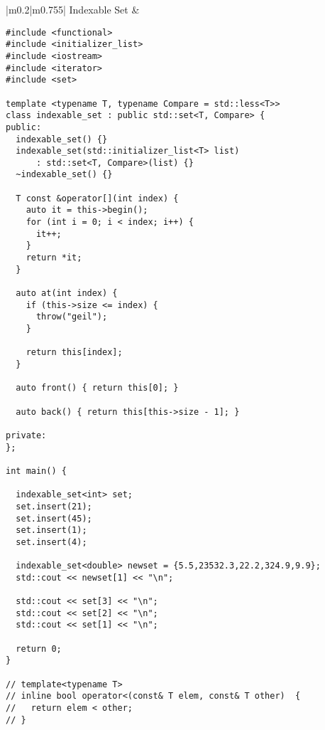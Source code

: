 \documentclass[main.tex,fontsize=8pt,paper=a4,paper=portrait,DIV=calc,]{scrartcl}
\begin{document}
\begin{table}[ht!]
\begin{tabular}{|m{0.2\linewidth}|m{0.755\linewidth}|}
\hline
Indexable Set & 
\vspace{2mm}
\begin{lstlisting}
#include <functional>
#include <initializer_list>
#include <iostream>
#include <iterator>
#include <set>

template <typename T, typename Compare = std::less<T>>
class indexable_set : public std::set<T, Compare> {
public:
  indexable_set() {}
  indexable_set(std::initializer_list<T> list)
      : std::set<T, Compare>(list) {}
  ~indexable_set() {}

  T const &operator[](int index) {
    auto it = this->begin();
    for (int i = 0; i < index; i++) {
      it++;
    }
    return *it;
  }

  auto at(int index) {
    if (this->size <= index) {
      throw("geil");
    }

    return this[index];
  }

  auto front() { return this[0]; }

  auto back() { return this[this->size - 1]; }

private:
};

int main() {

  indexable_set<int> set;
  set.insert(21);
  set.insert(45);
  set.insert(1);
  set.insert(4);

  indexable_set<double> newset = {5.5,23532.3,22.2,324.9,9.9};
  std::cout << newset[1] << "\n";

  std::cout << set[3] << "\n";
  std::cout << set[2] << "\n";
  std::cout << set[1] << "\n";

  return 0;
}

// template<typename T>
// inline bool operator<(const& T elem, const& T other)  {
//   return elem < other;
// }
\end{lstlisting}
\\
\hline
\end{tabular}
\end{table}
\pagebreak
\end{document}

